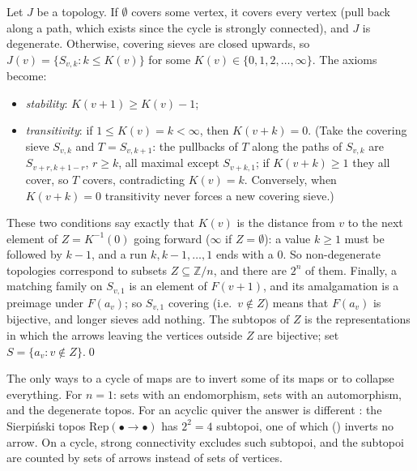 Let $J$ be a topology. If $\emptyset$ covers some vertex, it covers every vertex (pull back along a path, which exists since the cycle is strongly connected), and $J$ is degenerate. Otherwise, covering sieves are closed upwards, so $J(v) = \{S_{v,k} : k\le K(v)\}$ for some $K(v)\in\{0,1,2,\dots,\infty\}$. The axioms become:
\begin{itemize}
\item \emph{stability}: $K(v+1)\ge K(v)-1$;
\item \emph{transitivity}: if $1\le K(v) = k<\infty$, then $K(v+k) = 0$. (Take the covering sieve $S_{v,k}$ and $T = S_{v,k+1}$: the pullbacks of $T$ along the paths of $S_{v,k}$ are $S_{v+r,k+1-r}$, $r\ge k$, all maximal except $S_{v+k,1}$; if $K(v+k)\ge 1$ they all cover, so $T$ covers, contradicting $K(v) = k$. Conversely, when $K(v+k) = 0$ transitivity never forces a new covering sieve.)
\end{itemize}
These two conditions say exactly that $K(v)$ is the distance from $v$ to the next element of $Z = K^{-1}(0)$ going forward ($\infty$ if $Z = \emptyset$): a value $k\ge 1$ must be followed by $k-1$, and a run $k, k-1,\dots,1$ ends with a $0$. So non-degenerate topologies correspond to subsets $Z\subseteq\mathbb Z/n$, and there are $2^n$ of them. Finally, a matching family on $S_{v,1}$ is an element of $F(v+1)$, and its amalgamation is a preimage under $F(a_v)$; so $S_{v,1}$ covering (i.e.\ $v\notin Z$) means that $F(a_v)$ is bijective, and longer sieves add nothing. The subtopos of $Z$ is the representations in which the arrows leaving the vertices outside $Z$ are bijective; set $S = \{a_v : v\notin Z\}$.\qed

\inwords{} The only ways to  a cycle of maps are to invert some of its maps or to collapse everything. For $n = 1$: sets with an endomorphism, sets with an automorphism, and the degenerate topos. For an acyclic quiver the answer is different \cite{schmid}: the Sierpiński topos $\mathrm{Rep}(\bullet\to\bullet)$ has $2^2 = 4$ subtopoi, one of which () inverts no arrow. On a cycle, strong connectivity excludes such subtopoi, and the subtopoi are counted by sets of arrows instead of sets of vertices.
